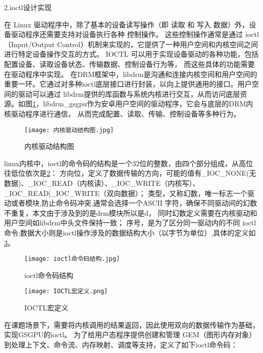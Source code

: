 2.ioctl设计实现

在 Linux 驱动程序中，除了基本的设备读写操作（即 读取 和 写入 数据）外，设备驱动程序还需要支持对设备执行各种 控制操作。
这些控制操作通常是通过 ioctl（Input/Output Control）机制来实现的，它提供了一种用户空间和内核空间之间进行特定设备操作交互的方式。
IOCTL 可以用于实现设备驱动的各种功能，包括配置设备、读取设备状态、传输数据、控制设备行为等， 而这些具体的功能需要在驱动程序中实现。
在DRM框架中，libdrm是沟通和连接内核空间和用户空间的重要一环。它通过对多种ioctl底层接口进行封装，以向上提供通用的接口。用户空间的驱动可以通过
libdrm提供的库函数与系统内核进行交互，从而访问底层资源。如图\ref{fig:内核驱动结构图}，libdrm\_gsgpu作为安卓用户空间的驱动程序，它会与底层的DRM内核驱动程序进行通信，
从而完成配置、读取、传输、控制设备等多种行为。

\begin{figure}[h]
  \centering
  \texttt{[image: 内核驱动结构图.jpg]}
  \caption{内核驱动结构图}
  \label{fig:内核驱动结构图}
\end{figure}

linux内核中，ioctl的命令码的结构是一个32位的整数，由四个部分组成，从高位往低位依次是\ref{fig:ioctl命令码结构}：
方向位，定义了数据传输的方向，可能的值有\_IOC\_NONE(无数据)、\_IOC\_READ（内核读）、\_IOC\_WRITE（内核写）、\_IOC\_READ|\_IOC\_WRITE（双向数据）；
类型，又称幻数，唯一标志一个驱动或者模块,防止命令码冲突,通常会选择一个ASCII 字符，确保不同驱动间的幻数不重复，本文由于涉及到的是drm模块所以是d，
同时幻数定义需要在内核驱动和用户空间如libdrm中头文件保持一致；
序号，是为了区分同一驱动内的不同 ioctl 命令;数据大小则是ioctl操作涉及的数据结构大小（以字节为单位）,具体的定义如\ref{fig:IOCTL宏定义}。

\begin{figure}[h]
  \centering
  \texttt{[image: ioctl命令码结构.jpg]}
  \caption{ioctl命令码结构}
  \label{fig:ioctl命令码结构}
\end{figure}

\begin{figure}[h]
  \centering
  \texttt{[image: IOCTL宏定义.png]}
  \caption{IOCTL宏定义}
  \label{fig:IOCTL宏定义}
\end{figure}

在课题场景下，需要将内核调用的结果返回，因此使用双向的数据传输作为基础，实现GSGPU的ioctl。
为了给用户态程序提供创建和管理 GEM（图形内存对象）到处理上下文、命令流、内存映射、调度等支持，定义了如下ioctl命令码：

